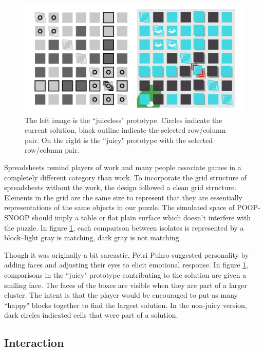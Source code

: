 \begin{figure}
\begin{center}
\includegraphics[width=150mm]{images/grid.pdf}
\caption[Differences between game layout in each prototype]{The left image is the ``juiceless" prototype. Circles indicate the current solution, black outline indicate the selected row/column pair. On the right is the ``juicy" prototype with the selected row/column pair.}
\label{fig:grid}
\end{center}
\end{figure}

Spreadsheets remind players of work and many people associate games in a completely different category than work. To incorporate the grid structure of spreadsheets without the work, the design followed a clean grid structure. Elements in the grid are the same size to represent that they are essentially representations of the same objects in our puzzle. The simulated space of POOP-SNOOP should imply a table or flat plain surface which doesn't interfere with the puzzle. In figure \ref{fig:grid}, each comparison between isolates is represented by a block--light gray is matching, dark gray is not matching.

Though it was originally a bit sarcastic, Petri Puhro \cite{juiceitorloseit} suggested personality by adding faces and adjusting their eyes to elicit emotional response. In figure \ref{fig:grid}, comparisons in the ``juicy" prototype contributing to the solution are given a smiling face. The faces of the boxes are visible when they are part of a larger cluster. The intent is that the player would be encouraged to put as many ``happy" blocks together to find the largest solution. In the non-juicy version, dark circles indicated cells that were part of a solution.

\subsection{Interaction}


